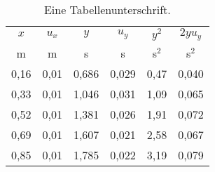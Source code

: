 \documentclass[11pt,a4paper]{article}
\begin{document}
\begin{table}[p]
\centering
\begin{tabular*}{0.99\textwidth}{@{\extracolsep{\fill}}cccccc}
\toprule
 $x$ & $u_x$ &  $y$  &  $u_y$ &  $y^2$  &  $2 y u_y$  \\
 m & m &  s & s &  s$^2$ & s$^2$  \\
\midrule
  0,16 & 0,01 & 0,686 & 0,029 & 0,47 & 0,040 \\
  0,33 & 0,01 & 1,046 & 0,031 & 1,09 & 0,065  \\
  0,52 & 0,01 & 1,381 & 0,026 & 1,91 & 0,072  \\
  0,69 & 0,01 & 1,607 & 0,021 & 2,58 & 0,067  \\
  0,85 & 0,01 & 1,785 & 0,022 & 3,19 & 0,079  \\	
\bottomrule
\end{tabular*}
\caption{Eine Tabellenunterschrift.}
\label{tabelle}
\end{table}


\end{document}
